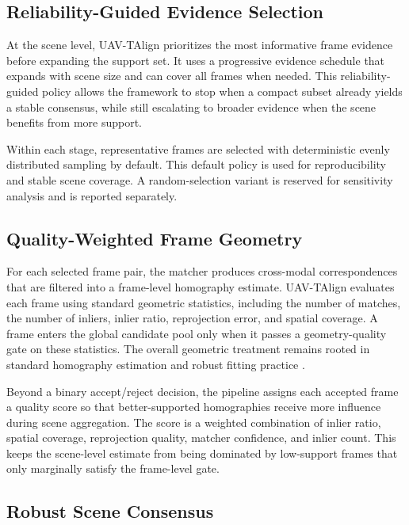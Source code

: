\subsection{Reliability-Guided Evidence Selection}

At the scene level, UAV-TAlign prioritizes the most informative frame evidence before expanding the
support set. It uses a progressive evidence schedule that expands with scene size and can cover all
frames when needed. This reliability-guided policy allows the framework to stop when a compact
subset already yields a stable consensus, while still escalating to broader evidence when the scene
benefits from more support.

Within each stage, representative frames are selected with deterministic evenly distributed
sampling by default. This default policy is used for reproducibility and stable scene coverage. A
random-selection variant is reserved for sensitivity analysis and is reported separately.

\subsection{Quality-Weighted Frame Geometry}

For each selected frame pair, the matcher produces cross-modal correspondences that are filtered
into a frame-level homography estimate. UAV-TAlign evaluates each frame using
standard geometric statistics, including the number of matches, the number of inliers, inlier
ratio, reprojection error, and spatial coverage. A frame enters the global candidate pool only when
it passes a geometry-quality gate on these statistics. The overall geometric treatment remains rooted
in standard homography estimation and robust fitting practice
\cite{hartley2004multiple,fischler1981ransac,barath2019magsac,barath2020magsacpp}.

Beyond a binary accept/reject decision, the pipeline assigns each accepted frame a quality score so
that better-supported homographies receive more influence during scene aggregation. The score is a
weighted combination of inlier ratio, spatial coverage, reprojection quality, matcher confidence,
and inlier count. This keeps the scene-level estimate from being dominated by low-support frames
that only marginally satisfy the frame-level gate.

\subsection{Robust Scene Consensus}

